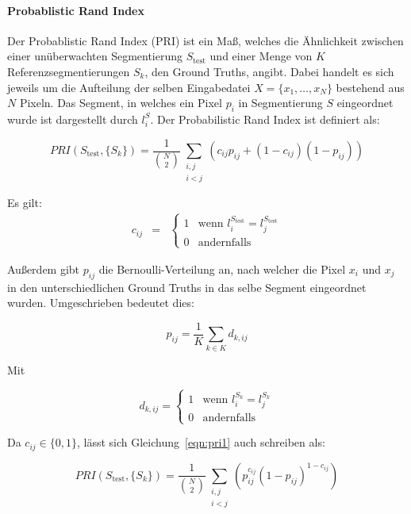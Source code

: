 \paragraph{Probablistic Rand Index}

Der Probablistic Rand Index (PRI) ist ein Maß, welches die Ähnlichkeit zwischen einer unüberwachten Segmentierung $S_\text{test}$ und einer Menge von $K$ Referenzsegmentierungen $S_k$, den Ground Truths, angibt. Dabei handelt es sich jeweils um die Aufteilung der selben Eingabedatei $X=\{x_1,\ldots,x_N\}$ bestehend aus $N$ Pixeln. Das Segment, in welches ein Pixel $p_i$ in Segmentierung $S$ eingeordnet wurde ist dargestellt durch $l_i^S$. Der Probabilistic Rand Index ist definiert als: \cite{pantofaru_07}

\begin{equation}
\label{eqn:pri1}
PRI(S_\text{test}, \{S_k\}) = \frac{1}{\binom{N}{2}} \sum_{\substack{i,j\\i<j}} \left(c_{ij}p_{ij}+\left(1-c_{ij}\right)\left(1-p_{ij}\right)\right)
\end{equation}

Es gilt:
\begin{eqnarray}
c_{ij}&=&\begin{cases}
1 & \text{wenn } l_i^{S_\text{test}}=l_j^{S_\text{test}}\\
0 & \text{andernfalls}
\end{cases}
\end{eqnarray}

Außerdem gibt $p_{ij}$ die Bernoulli-Verteilung an, nach welcher die Pixel $x_i$ und $x_j$ in den unterschiedlichen Ground Truths in das selbe Segment eingeordnet wurden. Umgeschrieben bedeutet dies:

\begin{equation}
p_{ij} = \frac{1}{K}\sum_{k\in K}d_{k, ij}
\end{equation}

Mit

\begin{equation}
\label{eqn:pri_d}
d_{k, ij} = \begin{cases}
1 & \text{wenn } l_i^{S_k}=l_j^{S_k}\\
0 & \text{andernfalls}
\end{cases}
\end{equation}

Da $c_{ij}\in\{0,1\}$, lässt sich Gleichung~\ref{eqn:pri1} auch schreiben als: \cite{pantofaru_07}

\begin{equation}
PRI(S_\text{test}, \{S_k\}) = \frac{1}{\binom{N}{2}} \sum_{\substack{i,j\\i<j}} \left(p_{ij}^{c_{ij}}\left(1-p_{ij}\right)^{1-c_{ij}}\right)
\end{equation}

